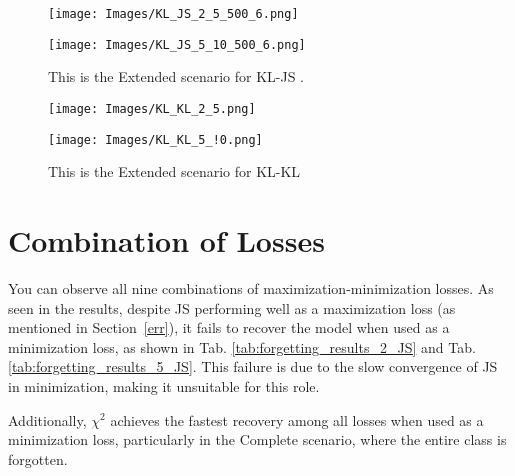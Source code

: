 \documentclass{article} %
\begin{document}
\begin{figure}[htp]
    \centering
     \vspace{-12pt}
    \begin{minipage}{0.45\textwidth}
        \centering
        \texttt{[image: Images/KL\_JS\_2\_5\_500\_6.png]}
        \label{fig:image5_A}
    \end{minipage}
    \hfill
    \begin{minipage}{0.45\textwidth}
        \centering
        \texttt{[image: Images/KL\_JS\_5\_10\_500\_6.png]}
        \label{fig:image5_B}
    \end{minipage}
    \caption{This is the Extended scenario for KL-JS .}
    \label{fig:Fig5}
\end{figure}
\begin{figure}[htp]
    \centering
    \begin{minipage}{0.45\textwidth}
        \centering
        \texttt{[image: Images/KL\_KL\_2\_5.png]}
        \label{fig:image6_A}
    \end{minipage}
    \hfill
    \begin{minipage}{0.45\textwidth}
        \centering
        \texttt{[image: Images/KL\_KL\_5\_!0.png]}
        \label{fig:image6_B}
    \end{minipage}
    \caption{This is the Extended scenario for KL-KL}
    \label{fig:Fig6}
\end{figure}
\clearpage
\section{Combination of Losses} \label{appendix:All}
You can observe all nine combinations of maximization-minimization losses. As seen in the results, despite JS performing well as a maximization loss (as mentioned in Section~\ref{err}), it fails to recover the model when used as a minimization loss, as shown in Tab. \ref{tab:forgetting_results_2_JS} and Tab. \ref{tab:forgetting_results_5_JS}. This failure is due to the slow convergence of JS in minimization, making it unsuitable for this role.

Additionally, $\chi^2$ achieves the fastest recovery among all losses when used as a minimization loss, particularly in the Complete scenario, where the entire class is forgotten.

%






\end{document}
